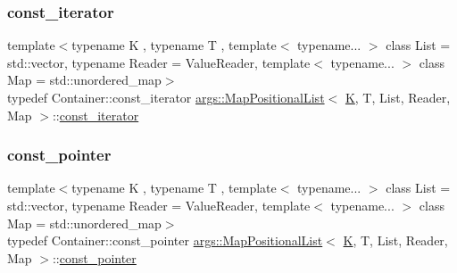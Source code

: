 \mbox{\label{classargs_1_1_map_positional_list_a0700556b0a067e095ee22edbb18206fc}} 
\subsubsection{\texorpdfstring{const\+\_\+iterator}{const\_iterator}}
{\footnotesize\ttfamily template$<$typename K , typename T , template$<$ typename... $>$ class List = std\+::vector, typename Reader  = Value\+Reader, template$<$ typename... $>$ class Map = std\+::unordered\+\_\+map$>$ \\
typedef Container\+::const\+\_\+iterator \hyperlink{classargs_1_1_map_positional_list}{args\+::\+Map\+Positional\+List}$<$ \hyperlink{cgal__test_8cpp_a891e241aa245ae63618f03737efba309}{K}, T, List, Reader, Map $>$\+::\hyperlink{classargs_1_1_map_positional_list_a0700556b0a067e095ee22edbb18206fc}{const\+\_\+iterator}}

\mbox{\label{classargs_1_1_map_positional_list_aa4ce0fca25572ffad42a9b2b9c86c691}} 
\subsubsection{\texorpdfstring{const\+\_\+pointer}{const\_pointer}}
{\footnotesize\ttfamily template$<$typename K , typename T , template$<$ typename... $>$ class List = std\+::vector, typename Reader  = Value\+Reader, template$<$ typename... $>$ class Map = std\+::unordered\+\_\+map$>$ \\
typedef Container\+::const\+\_\+pointer \hyperlink{classargs_1_1_map_positional_list}{args\+::\+Map\+Positional\+List}$<$ \hyperlink{cgal__test_8cpp_a891e241aa245ae63618f03737efba309}{K}, T, List, Reader, Map $>$\+::\hyperlink{classargs_1_1_map_positional_list_aa4ce0fca25572ffad42a9b2b9c86c691}{const\+\_\+pointer}}

\mbox{\label{classargs_1_1_map_positional_list_a49c2fa40c50f8d1c4f3ef6023761972d}} 
